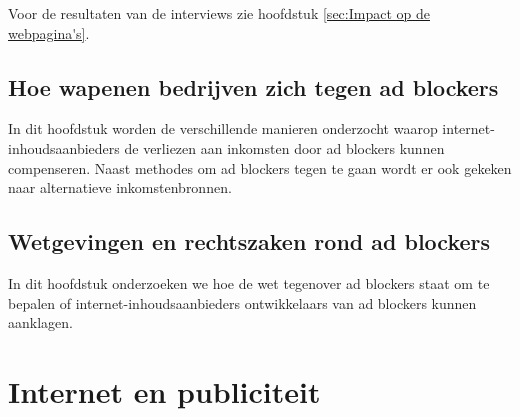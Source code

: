 \documentclass[pdftex,a4paper,12pt,twoside]{report}
\begin{document}
Voor de resultaten van de interviews zie hoofdstuk \ref{sec:Impact op de webpagina's}. 
\section{Hoe wapenen bedrijven zich tegen ad blockers}
In dit hoofdstuk worden de verschillende manieren onderzocht waarop internet-inhoudsaanbieders de verliezen aan inkomsten door ad blockers kunnen compenseren. Naast methodes om ad blockers tegen te gaan wordt er ook gekeken naar alternatieve inkomstenbronnen.  
\section{Wetgevingen en rechtszaken rond ad blockers}
In dit hoofdstuk onderzoeken we hoe de wet tegenover ad blockers staat om te bepalen of internet-inhoudsaanbieders ontwikkelaars van ad blockers kunnen aanklagen.
\chapter{Internet en publiciteit}
\label{ch:Internet en publiciteit}
\end{document}
